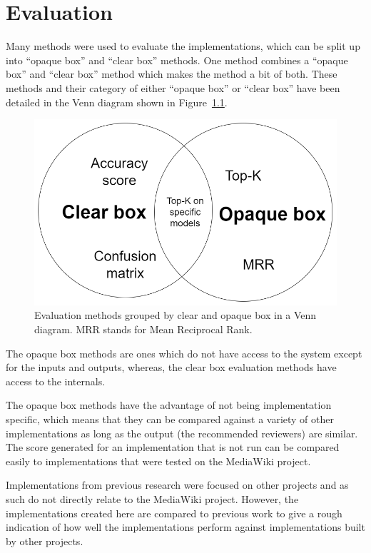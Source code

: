 \chapter{Evaluation\label{chap:evaluation}}

Many methods were used to evaluate the implementations, which can be split up into ``opaque box'' and ``clear box'' methods. One method combines a ``opaque box'' and ``clear box'' method which makes the method a bit of both. These methods and their category of either ``opaque box'' or ``clear box'' have been detailed in the Venn diagram shown in  Figure~\ref{fig:evalaution-venn-diagram}.

\begin{figure}[h]
    \centering
    \includegraphics[scale=0.3]{images/evaluation-venn.png}
    \caption[Evaluation methods grouped by clear and opaque box in a Venn diagram.]{Evaluation methods grouped by clear and opaque box in a Venn diagram. MRR stands for Mean Reciprocal Rank.}
    \label{fig:evalaution-venn-diagram}
\end{figure}

The opaque box methods are ones which do not have access to the system except for the inputs and outputs, whereas, the clear box evaluation methods have access to the internals.

The opaque box methods have the advantage of not being implementation specific, which means that they can be compared against a variety of other implementations as long as the output (the recommended reviewers) are similar. The score generated for an implementation that is not run can be compared easily to implementations that were tested on the MediaWiki project.

Implementations from previous research were focused on other projects and as such do not directly relate to the MediaWiki project. However, the implementations created here are compared to previous work to give a rough indication of how well the implementations perform against implementations built by other projects.

